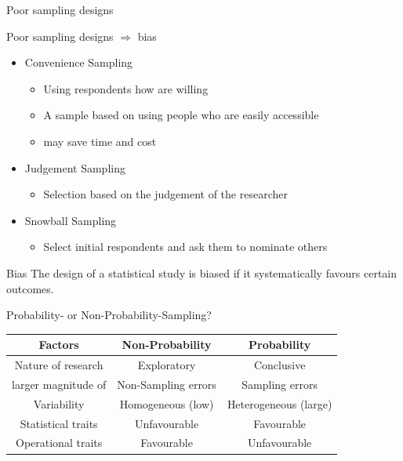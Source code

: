 \documentclass[10pt, compress]{beamer}
\begin{document}
\begin{frame}[t]{Poor sampling designs}
    \begin{block}{Poor sampling designs $\Rightarrow$ bias}
        \begin{itemize}
            \item Convenience Sampling
            \begin{itemize}
                \item Using respondents how are willing
                \item A sample based on using people who are easily accessible
                \item may save time and cost
            \end{itemize}
            \item Judgement Sampling
            \begin{itemize}
                \item Selection based on the judgement of the researcher
            \end{itemize}
            \item Snowball Sampling
            \begin{itemize}
                \item Select initial respondents and ask them to nominate others
            \end{itemize}
        \end{itemize}
    \end{block}
    \begin{block}{Bias}
        The design of a statistical study is biased if it systematically favours certain outcomes.
    \end{block}
\end{frame}

\begin{frame}[t]{Probability- or Non-Probability-Sampling?}
    \begin{table}
        \centering
        \begin{tabular}{|c|c|c|}
            \hline
            Factors & Non-Probability & Probability \\
            \hline
            \hline
            Nature of research & Exploratory & Conclusive \\
            larger magnitude of & Non-Sampling errors & Sampling errors \\
            Variability & Homogeneous (low) & Heterogeneous (large) \\
            Statistical traits & Unfavourable & Favourable \\
            Operational traits & Favourable & Unfavourable \\
            \hline
        \end{tabular}
    \end{table}
\end{frame}
\end{document}
